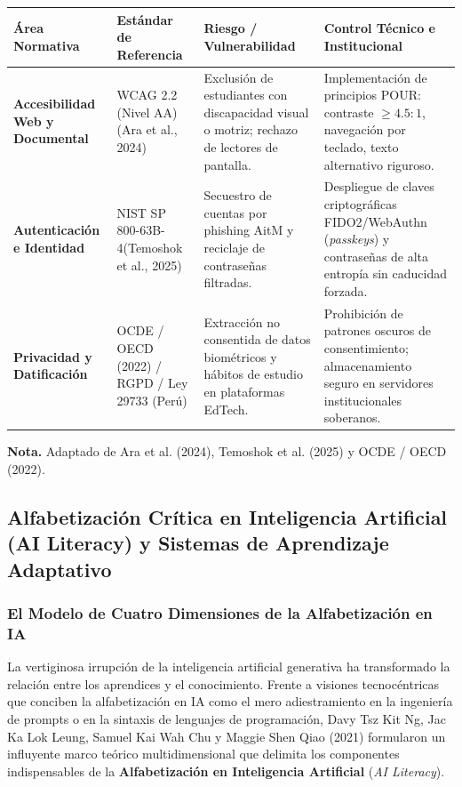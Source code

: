 \begin{table}[htpb!]
\centering
\small
\begin{tabularx}{\textwidth}{p{3.2cm} p{3.8cm} p{4.0cm} X}
\toprule
\textbf{Área Normativa} & \textbf{Estándar de Referencia} & \textbf{Riesgo / Vulnerabilidad} & \textbf{Control Técnico e Institucional} \\
\midrule
\textbf{Accesibilidad Web y Documental} & WCAG 2.2 (Nivel AA)\newline(Ara et al., 2024) & Exclusión de estudiantes con discapacidad visual o motriz; rechazo de lectores de pantalla. & Implementación de principios POUR: contraste $\ge 4.5:1$, navegación por teclado, texto alternativo riguroso. \\
\midrule
\textbf{Autenticación e Identidad} & NIST SP 800-63B-4\newline(Temoshok et al., 2025) & Secuestro de cuentas por phishing AitM y reciclaje de contraseñas filtradas. & Despliegue de claves criptográficas FIDO2/WebAuthn (\textit{passkeys}) y contraseñas de alta entropía sin caducidad forzada. \\
\midrule
\textbf{Privacidad y Datificación} & OCDE / OECD (2022) / RGPD / Ley 29733 (Perú) & Extracción no consentida de datos biométricos y hábitos de estudio en plataformas EdTech. & Prohibición de patrones oscuros de consentimiento; almacenamiento seguro en servidores institucionales soberanos. \\
\bottomrule
\end{tabularx}
\vspace{0.2cm}
\begin{flushleft}
\scriptsize \textbf{Nota.} Adaptado de Ara et al. (2024), Temoshok et al. (2025) y OCDE / OECD (2022).
\end{flushleft}
\end{table}

\newpage

\subsection{Alfabetización Crítica en Inteligencia Artificial (AI Literacy) y Sistemas de Aprendizaje Adaptativo}

\subsubsection{El Modelo de Cuatro Dimensiones de la Alfabetización en IA}

La vertiginosa irrupción de la inteligencia artificial generativa ha transformado la relación entre los aprendices y el conocimiento. Frente a visiones tecnocéntricas que conciben la alfabetización en IA como el mero adiestramiento en la ingeniería de prompts o en la sintaxis de lenguajes de programación, Davy Tsz Kit Ng, Jac Ka Lok Leung, Samuel Kai Wah Chu y Maggie Shen Qiao (2021) formularon un influyente marco teórico multidimensional que delimita los componentes indispensables de la \textbf{Alfabetización en Inteligencia Artificial} (\textit{AI Literacy}).

